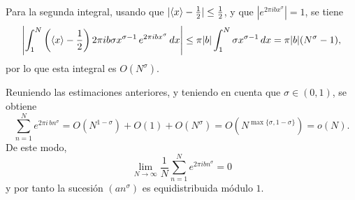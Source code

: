 \begin{resolve}
    Para la segunda integral, usando que $|\langle x \rangle - \frac{1}{2}| \leq \frac{1}{2}$,
    y que $|e^{2\pi i b x^\sigma}| = 1$, se tiene
    \[
        \left|\int_1^N \left(\langle x \rangle - \frac{1}{2}\right) 2\pi i b \sigma x^{\sigma-1} \, e^{2\pi i b x^\sigma} \, dx\right|
        \leq \pi |b| \int_1^N \sigma x^{\sigma-1} \, dx  
        = \pi |b| (N^\sigma - 1),
    \]
    por lo que esta integral es $O(N^\sigma)$.
    
    Reuniendo las estimaciones anteriores, y teniendo en cuenta que 
    $\sigma \in (0,1)$, se obtiene
    \[
        \sum_{n=1}^N e^{2\pi i \, b n^\sigma} = O(N^{1-\sigma}) + O(1) + O(N^\sigma) = O(N^{\max\{\sigma, 1-\sigma\}}) = o(N).
    \]
    De este modo,
    \[
        \lim_{N \to \infty} \frac{1}{N} \sum_{n=1}^N e^{2\pi i b n^\sigma} = 0
    \]
    y por tanto la sucesión $(an^\sigma)$ es equidistribuida módulo $1$.
\end{resolve}

